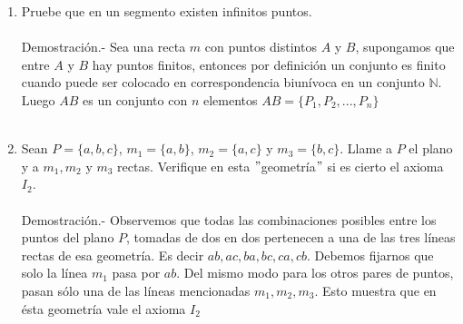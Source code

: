 \begin{enumerate}
\begin{enumerate}[\bfseries (a)]
	\end{enumerate}

    \item Pruebe que en un segmento existen infinitos puntos.\\\\
    Demostración.-\; Sea una recta $m$ con puntos distintos $A$ y $B$, supongamos que entre $A$ y $B$ hay puntos finitos, entonces por definición un conjunto es finito cuando puede ser colocado en correspondencia biunívoca en un conjunto $\mathbb{N}$. Luego $AB$ es un conjunto con $n$ elementos $AB=\lbrace P_1,P_2,...,P_n \rbrace$\\\\

    \item Sean $P=\lbrace a,b,c \rbrace$, $m_1=\lbrace a,b \rbrace$, $m_2=\lbrace a,c \rbrace$ y $m_3=\lbrace b,c \rbrace$. Llame a $P$ el plano y a $m_1,m_2$ y $m_3$ rectas. Verifique en esta $"$geometría$"$ si es cierto el axioma $I_2$.\\\\
    Demostración.-\; Observemos que todas las combinaciones posibles entre los puntos del plano $P$, tomadas de dos en dos pertenecen a una de las tres líneas rectas de esa geometría. Es decir $ab,ac,ba,bc,ca,cb$. Debemos fijarnos que solo la línea $m_1$ pasa por $ab$. Del mismo modo para los otros pares de puntos, pasan sólo una de las líneas mencionadas $m_1,m_2,m_3$. Esto muestra que en ésta geometría vale el axioma $I_2$\\\\


\end{enumerate}
